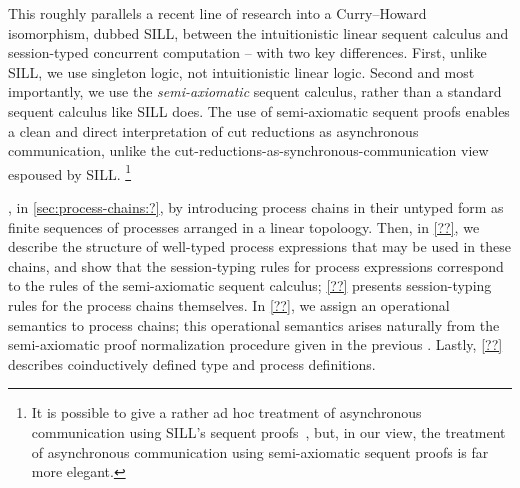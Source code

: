 This roughly parallels a recent line of research into a Curry--Howard isomorphism, dubbed SILL, between the intuitionistic linear sequent calculus and session-typed concurrent computation\autocites{Caires+:MSCS16}{Caires+:TLDI12} -- with two key differences.
First, unlike SILL, we use singleton logic, not intuitionistic linear logic.
Second and most importantly, we use the \emph{semi-axiomatic} sequent calculus, rather than a standard sequent calculus like SILL does.
The use of semi-axiomatic sequent proofs enables a clean and direct interpretation of cut reductions as asynchronous communication, unlike the cut-reductions-as-synchronous-communication view espoused by SILL.%
\footnote{It is possible to give a rather ad hoc treatment of asynchronous communication using SILL's sequent proofs~\parencite{DeYoung+:CSL12}, but, in our view, the treatment of asynchronous communication using semi-axiomatic sequent proofs is far more elegant.}







, in \cref{sec:process-chains:?}, by introducing process chains in their untyped form as finite sequences of processes arranged in a linear topoloogy.
Then, in \cref{??}, we describe the structure of well-typed process expressions that may be used in these chains, and show that the session-typing rules for process expressions correspond to the rules of the semi-axiomatic sequent calculus;
\cref{??} presents session-typing rules for the process chains themselves.
In \cref{??}, we assign an operational semantics to process chains; this operational semantics arises naturally from the semi-axiomatic proof normalization procedure given in the previous .
Lastly, \cref{??} describes coinductively defined type and process definitions.


